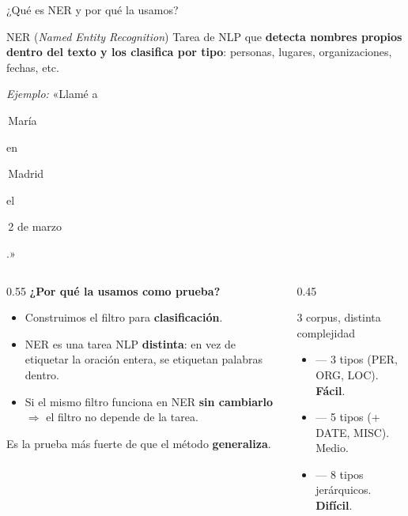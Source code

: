 \begin{frame}{¿Qué es NER y por qué la usamos?}

\begin{block}{\small NER (\textit{Named Entity Recognition})}
\scriptsize
Tarea de NLP que \textbf{detecta nombres propios dentro del texto y los clasifica por tipo}: personas, lugares, organizaciones, fechas, etc.

\vspace{0.3em}
\textit{Ejemplo:} «Llamé a \colorbox{uaiblue!25}{\strut\,María\,} en \colorbox{uaiorange!25}{\strut\,Madrid\,} el \colorbox{uaigreen!25}{\strut\,2 de marzo\,}.»\hspace{0.5em}{\tiny \textcolor{uaiblue}{$\uparrow$PER}\hspace{1em}\textcolor{uaiorange}{$\uparrow$LOC}\hspace{1em}\textcolor{uaigreen}{$\uparrow$DATE}}
\end{block}

\vspace{0.4em}
\begin{columns}[T]

\begin{column}{0.55\textwidth}
\small
\textbf{¿Por qué la usamos como prueba?}
\begin{itemize}\setlength\itemsep{1pt}\scriptsize
  \item Construimos el filtro para \textbf{clasificación}.
  \item NER es una tarea NLP \textbf{distinta}: en vez de etiquetar la oración entera, se etiquetan palabras dentro.
  \item Si el mismo filtro funciona en NER \textbf{sin cambiarlo} $\Rightarrow$ el filtro \alert{no depende de la tarea}.
\end{itemize}

\vspace{0.2em}
{\scriptsize Es la prueba más fuerte de que el método \textbf{generaliza}.}
\end{column}

\begin{column}{0.45\textwidth}
\begin{block}{\small 3 corpus, distinta complejidad}
\scriptsize
\begin{itemize}\setlength\itemsep{1pt}
  \item {} --- 3 tipos (PER, ORG, LOC). \textbf{Fácil}.
  \item {} --- 5 tipos (+ DATE, MISC). Medio.
  \item {} --- 8 tipos jerárquicos. \textbf{Difícil}.
\end{itemize}
\end{block}
\end{column}

\end{columns}

\end{frame}

